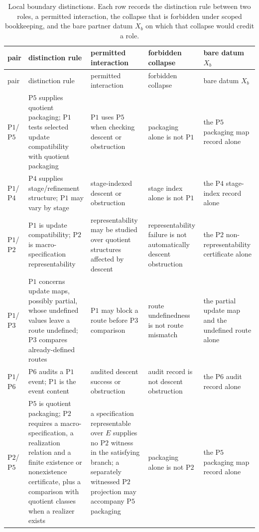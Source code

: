 \documentclass[11pt]{article}
\theoremstyle{definition}
\newcommand{\Pone}{\ensuremath{\mathrm{P1}}}
\newcommand{\Ptwo}{\ensuremath{\mathrm{P2}}}
\newcommand{\Pthree}{\ensuremath{\mathrm{P3}}}
\newcommand{\Pfour}{\ensuremath{\mathrm{P4}}}
\newcommand{\Pfive}{\ensuremath{\mathrm{P5}}}
\newcommand{\Psix}{\ensuremath{\mathrm{P6}}}
\begin{document}
\begingroup\footnotesize
\setlength{\LTleft}{0pt}\setlength{\LTright}{0pt}
\renewcommand{\arraystretch}{1.15}
\begin{longtable}{@{}>{\raggedright\arraybackslash}p{1.2cm}>{\raggedright\arraybackslash}p{4.3cm}>{\raggedright\arraybackslash}p{3.0cm}>{\raggedright\arraybackslash}p{3.0cm}>{\raggedright\arraybackslash}p{2.9cm}@{}}
\caption{Local boundary distinctions. Each row records the distinction
rule between two roles, a permitted interaction, the collapse that
is forbidden under scoped bookkeeping, and the bare partner datum \(X_b\)
on which that collapse would credit a role.}\label{tab:boundary-matrix}\\
\toprule
pair & distinction rule & permitted interaction & forbidden collapse & bare datum \(X_b\) \\
\midrule
\endfirsthead
\toprule
pair & distinction rule & permitted interaction & forbidden collapse & bare datum \(X_b\) \\
\midrule
\endhead
\bottomrule
\endfoot
\Pone{}/\Pfive{} & \Pfive{} supplies quotient packaging; \Pone{} tests selected update compatibility with quotient packaging & \Pone{} uses \Pfive{} when checking descent or obstruction & packaging alone is not \Pone{} & the \Pfive{} packaging map record alone \\
\Pone{}/\Pfour{} & \Pfour{} supplies stage/refinement structure; \Pone{} may vary by stage & stage-indexed descent or obstruction & stage index alone is not \Pone{} & the \Pfour{} stage-index record alone \\
\Pone{}/\Ptwo{} & \Pone{} is update compatibility; \Ptwo{} is macro-specification representability & representability may be studied over quotient structures affected by descent & representability failure is not automatically descent obstruction & the \Ptwo{} non-representability certificate alone \\
\Pone{}/\Pthree{} & \Pone{} concerns update maps, possibly partial, whose undefined values leave a route undefined; \Pthree{} compares already-defined routes & \Pone{} may block a route before \Pthree{} comparison & route undefinedness is not route mismatch & the partial update map and the undefined route alone \\
\Pone{}/\Psix{} & \Psix{} audits a \Pone{} event; \Pone{} is the event content & audited descent success or obstruction & audit record is not descent obstruction & the \Psix{} audit record alone \\
\Ptwo{}/\Pfive{} & \Pfive{} is quotient packaging; \Ptwo{} requires a macro-specification, a realization relation and a finite existence or nonexistence certificate, plus a comparison with quotient classes when a realizer exists & a specification representable over \(E\) supplies no \Ptwo{} witness in the satisfying branch; a separately witnessed \Ptwo{} projection may accompany \Pfive{} packaging & packaging alone is not \Ptwo{} & the \Pfive{} packaging map record alone \\

\end{longtable}
\end{document}
